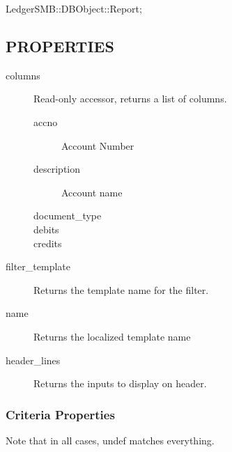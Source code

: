 \begin{description}
\begin{description}
\begin{description}
\begin{description}
\begin{description}
\begin{description}
\begin{description}
\begin{description}
\begin{description}
\begin{description}
\begin{description}
\item[{LedgerSMB::DBObject::Report;}] \mbox{}\end{description}
\subsection*{PROPERTIES\label{LedgerSMB::DBObject::Report::co::Balance_y_Mayor_PROPERTIES}}
\begin{description}

\item[{columns}] \mbox{}

Read-only accessor, returns a list of columns.

\begin{description}

\item[{accno}] \mbox{}

Account Number


\item[{description}] \mbox{}

Account name


\item[{document\_type}] \mbox{}
\item[{debits}] \mbox{}
\item[{credits}] \mbox{}\end{description}

\item[{filter\_template}] \mbox{}

Returns the template name for the filter.


\item[{name}] \mbox{}

Returns the localized template name


\item[{header\_lines}] \mbox{}

Returns the inputs to display on header.

\end{description}
\subsubsection*{Criteria Properties\label{LedgerSMB::DBObject::Report::co::Balance_y_Mayor_Criteria_Properties}}


Note that in all cases, undef matches everything.

\begin{description}


\end{description}
\end{description}
\end{description}
\end{description}
\end{description}
\end{description}
\end{description}
\end{description}
\end{description}
\end{description}
\end{description}
